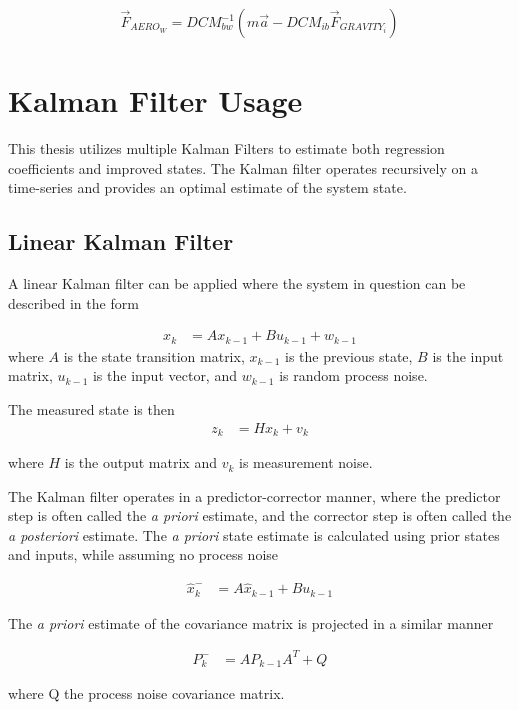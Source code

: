 \documentclass[12pt]{ucthesis}
\begin{document}
\begin{align}
\vec{F}_{AERO_W} = DCM_{bw}^{-1}(m\vec{a} - DCM_{ib}\vec{F}_{GRAVITY_i})
\end{align}


\section{Kalman Filter Usage}
\label{kalman-filter}
This thesis utilizes multiple Kalman Filters to estimate both regression coefficients and improved states. The Kalman filter operates recursively on a time-series and provides an optimal estimate of the system state.

\subsection{Linear Kalman Filter}
A linear Kalman filter can be applied where the system in question can be described in the form \cite{welch1995introduction}

\begin{align}
x_k &= Ax_{k-1} + Bu_{k-1}+w_{k-1}
\end{align}
where $A$ is the state transition matrix, $x_{k-1}$ is the previous state, $B$ is the input matrix, $u_{k-1}$ is the input vector, and $w_{k-1}$ is random process noise.

The measured state is then 
\begin{align}
z_k &= Hx_k+v_k
\end{align} 

where $H$ is the output matrix and $v_k$ is measurement noise.

\indent
The Kalman filter operates in a predictor-corrector manner, where the predictor step is often called the \textit{a priori} estimate, and the corrector step is often called the \textit{a posteriori} estimate. The \textit{a priori} state estimate is calculated using prior states and inputs, while assuming no process noise

\begin{align}
\hat{x}^-_k &= A\hat{x}_{k-1}+Bu_{k-1}
\end{align}



The \textit{a priori} estimate of the covariance matrix is projected in a similar manner

\begin{align}
P^-_k &= AP_{k-1}A^T+Q
\end{align}

where Q the process noise covariance matrix.
\end{document}
